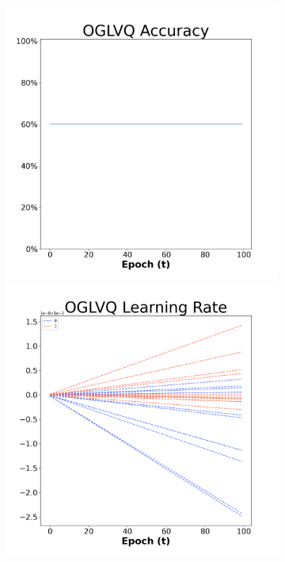 \begin{figure}[H]
  \centering %
\begin{subfigure}{0.3\textwidth}
\includegraphics[width=\linewidth]{images/exper1/NSP/OGLVQ_0.01_acc.png}
  \includegraphics[width=\linewidth]{images/exper1/NSP/OGLVQ_0.01_lr.png}

\end{subfigure}
\end{figure}
